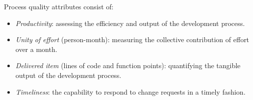 Process quality attributes consist of:
\begin{itemize}
    \item \textit{Productivity}: assessing the efficiency and output of the development process.
    \item \textit{Unity of effort} (person-month): measuring the collective contribution of effort over a month.
    \item \textit{Delivered item} (lines of code and function points): quantifying the tangible output of the development process.
    \item \textit{Timeliness}: the capability to respond to change requests in a timely fashion.
\end{itemize}